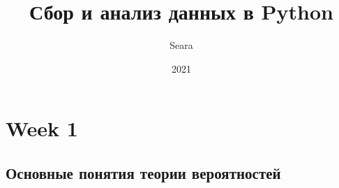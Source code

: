 \documentclass{article}
\title{Сбор и анализ данных в Python}
\date{2021}
\author{Seara}
\begin{document}
\maketitle
\newpage
{}

\section{Week 1}

\subsection{Основные понятия теории вероятностей}
\end{document}

